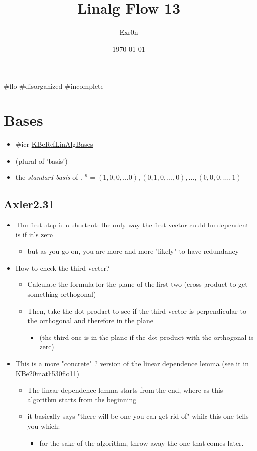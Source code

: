 \documentclass[letterpaper]{article}
\author{Exr0n}
\date{\today}
\title{Linalg Flow 13}
\renewcommand{\tableofcontents}{}
\begin{document}
\tableofcontents

\#flo \#disorganized \#incomplete

\section{Bases}
\label{sec:org584dfa7}
\begin{itemize}
\item \#icr \href{KBeRefLinAlgBases.org}{KBeRefLinAlgBases}
\item (plural of 'basis')
\item the \emph{standard basis} of
\(\mathbb{F}^n = (1, 0, 0, \ldots 0), (0, 1, 0, \ldots, 0), \ldots, (0, 0, 0, \ldots, 1)\)
\end{itemize}

\subsection{Axler2.31}
\label{sec:org55d9d36}
\begin{itemize}
\item The first step is a shortcut: the only way the first vector could be
dependent is if it's zero

\begin{itemize}
\item but as you go on, you are more and more "likely" to have redundancy
\end{itemize}

\item How to check the third vector?

\begin{itemize}
\item Calculate the formula for the plane of the first two (cross product
to get something orthogonal)
\item Then, take the dot product to see if the third vector is
perpendicular to the orthogonal and therefore in the plane.

\begin{itemize}
\item (the third one is in the plane if the dot product with the
orthogonal is zero)
\end{itemize}
\end{itemize}

\item This is a more "concrete" ? version of the linear dependence lemma
(see it in \href{KBe20math530flo11.org}{KBe20math530flo11})

\begin{itemize}
\item The linear dependence lemma starts from the end, where as this
algorithm starts from the beginning
\item it basically says "there will be one you can get rid of" while this
one tells you which:

\begin{itemize}
\item for the sake of the algorithm, throw away the one that comes
later.
\end{itemize}
\end{itemize}
\end{itemize}
\end{document}
